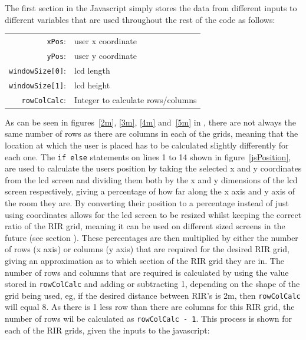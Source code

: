 \documentclass[../../main.tex]{subfiles}
\begin{document}
				The first section in the Javascript simply stores the data from different inputs to different variables that are used throughout the rest of the code as follows:

				\begin{center}
				\begin{tabular}{r l}
					\texttt{xPos}: & user x coordinate \\
					\texttt{yPos}: & user y coordinate \\
					\texttt{windowSize[0]}: & lcd length \\
					\texttt{windowSize[1]}: & lcd height \\
					\texttt{rowColCalc}: & Integer to calculate rows/columns \\
				\end{tabular}
				\end{center}

				\vspace{5mm}

				As can be seen in figures~\ref{2m}, \ref{3m}, \ref{4m} and~\ref{5m} in , there are not always the same number of rows as there are columns in each of the grids, meaning that the location at which the user is placed has to be calculated slightly differently for each one. The \texttt{if else} statements on lines 1 to 14 shown in figure~\ref{jsPosition}, are used to calculate the users position by taking the selected x and y coordinates from the lcd screen and dividing them both by the x and y dimensions of the lcd screen respectively, giving a percentage of how far along the x axis and y axis of the room they are. By converting their position to a percentage instead of just using coordinates allows for the lcd screen to be resized whilst keeping the correct ratio of the \ac{RIR} grid, meaning it can be used on different sized screens in the future (see section ). These percentages are then multiplied by either the number of rows (x axis) or columns (y axis) that are required for the desired \ac{RIR} grid, giving an approximation as to which section of the \ac{RIR} grid they are in. The number of rows and columns that are required is calculated by using the value stored in \texttt{rowColCalc} and adding or subtracting 1, depending on the shape of the grid being used, eg, if the desired distance between \ac{RIR}'s is 2m, then \texttt{rowColCalc} will equal 8. As there is 1 less row than there are columns for this \ac{RIR} grid, the number of rows wil be calculated as \texttt{rowColCalc - 1}. This process is shown for each of the \ac{RIR} grids, given the inputs to the javascript:
\end{document}
